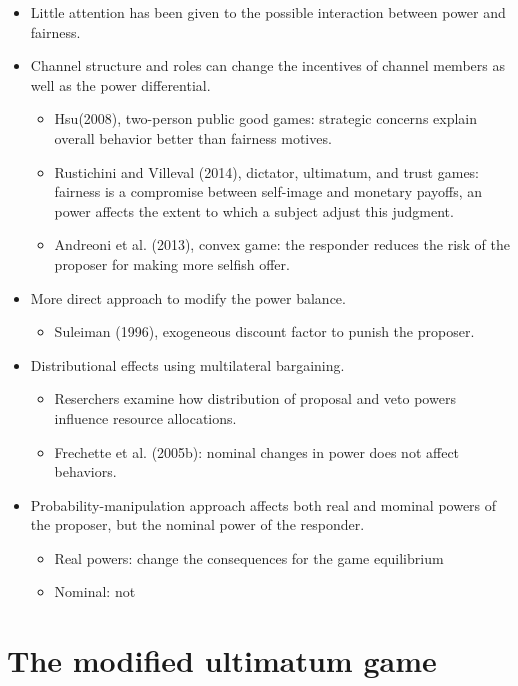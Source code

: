 \documentclass[../root]{subfiles}
\begin{document}
    \begin{itemize}
      \item Little attention has been given to the possible interaction between power and fairness.
      \item Channel structure and roles can change the incentives of channel members as well as the power differential.
      \begin{itemize}
        \item Hsu(2008), two-person public good games: strategic concerns explain overall behavior better than fairness motives.
        \item Rustichini and Villeval (2014), dictator, ultimatum, and trust games: fairness is a compromise between self-image and monetary payoffs, an power affects the extent to which a subject adjust this judgment.
        \item Andreoni et al. (2013), convex game: the responder reduces the risk of the proposer for making more selfish offer.
      \end{itemize}
      \item More direct approach to modify the power balance.
      \begin{itemize}
        \item Suleiman (1996), exogeneous discount factor to punish the proposer.
      \end{itemize}
      \item Distributional effects using multilateral bargaining.
      \begin{itemize}
        \item Reserchers examine how distribution of proposal and veto powers influence resource allocations.
        \item Frechette et al. (2005b): nominal changes in power does not affect behaviors.
      \end{itemize}
      \item Probability-manipulation approach affects both real and mominal powers of the proposer, but the nominal power of the responder.
      \begin{itemize}
        \item Real powers: change the consequences for the game equilibrium
        \item Nominal: not
      \end{itemize}
    \end{itemize}

    \section{The modified ultimatum game}
\end{document}
